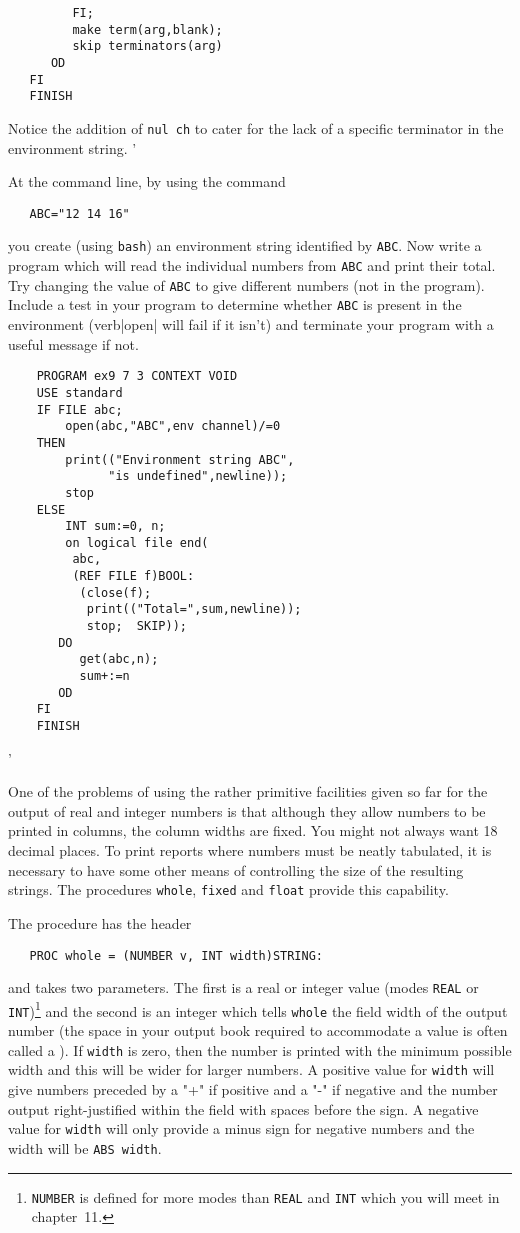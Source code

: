 \begin{exercise}
\begin{verbatim}
         FI;
         make term(arg,blank);
         skip terminators(arg)
      OD
   FI
   FINISH
\end{verbatim}
\noindent
Notice the addition of \verb|nul ch| to cater for the lack of a
specific terminator in the environment string.
'
\item At the command line, by using the command
\begin{verbatim}
   ABC="12 14 16"
\end{verbatim}
\noindent
you create (using \verb|bash|) an environment string identified by
\verb|ABC|. Now write a program which will read the individual
numbers from \verb|ABC| and print their total. Try changing the value
of \verb|ABC| to give different numbers (not in the program). Include
a test in your program to determine whether \verb|ABC| is present in
the environment (verb|open| will fail if it isn't) and terminate your
program with a useful message if not. \ans \ %
\begin{verbatim}
    PROGRAM ex9 7 3 CONTEXT VOID
    USE standard
    IF FILE abc;
        open(abc,"ABC",env channel)/=0
    THEN
        print(("Environment string ABC",
              "is undefined",newline));
        stop
    ELSE
        INT sum:=0, n;
        on logical file end(
         abc,
         (REF FILE f)BOOL:
          (close(f);
           print(("Total=",sum,newline));
           stop;  SKIP));
       DO
          get(abc,n);
          sum+:=n
       OD
    FI
    FINISH
\end{verbatim}
'
\end{exercise}

One of the problems of using the rather primitive facilities given
so far for the output of real and integer numbers is that although
they allow numbers to be printed in columns, the column widths are
fixed.  You might not always want 18 decimal places. To print reports
where numbers must be neatly tabulated, it is necessary to have some
other means of controlling the size of the resulting strings. The
procedures \texttt{whole}, \texttt{fixed} and \texttt{float} provide
this capability.

The procedure  has the header
\begin{verbatim}
   PROC whole = (NUMBER v, INT width)STRING:
\end{verbatim}
\noindent
and takes two parameters. The first is a real or integer value (modes
\verb|REAL| or \verb|INT|)\footnote{\texttt{NUMBER} is defined for
more modes than \texttt{REAL} and \texttt{INT} which you will meet in
chapter~11.} and the second is an integer which tells \verb|whole|
the field width of the output number (the space in your output book
required to accommodate a value is often called a ). If
\verb|width| is zero, then the number is printed with the minimum
possible width and this will be wider for larger numbers. A positive
value for \verb|width| will give numbers preceded by a "+" if
positive and a "-" if negative and the number output right-justified
within the field with spaces before the sign. A negative value for
\verb|width| will only provide a minus sign for negative numbers and
the width will be \verb|ABS width|.

